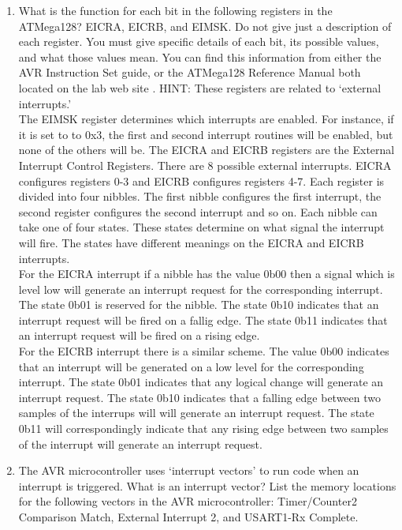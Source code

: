 \documentclass[12pt,letterpaper]{article}
\begin{document}
\begin{enumerate}
    \item What is the function for each bit in the following registers in the
    ATMega128? EICRA, EICRB, and EIMSK. Do not give just a description of each
    register. You must give specific details of each bit, its possible values,
    and what those values mean.  You can find this information from either the
    AVR Instruction Set guide, or the ATMega128 Reference Manual both located
    on the lab web site .  HINT:  These  registers  are  related  to  ‘external
    interrupts.’\\
    The EIMSK register determines which interrupts are enabled. For instance,
if it is set to to 0x3, the first and second interrupt routines will be
enabled, but none of the others will be.
    The EICRA and EICRB registers are the External Interrupt Control Registers.
    There are 8 possible external interrupts. EICRA configures registers 0-3
    and EICRB configures registers 4-7. Each register is divided into four
    nibbles. The first nibble configures the first interrupt, the second
    register configures the second interrupt and so on. Each nibble can take
    one of four states. These states determine on what signal the interrupt
    will fire. The states have different meanings on the EICRA and EICRB
    interrupts.\\
    For the EICRA interrupt if a nibble has the value 0b00 then a signal which is
    level low will generate an interrupt request for the corresponding
    interrupt. The state 0b01 is reserved for the nibble. The state 0b10
    indicates that an interrupt request will be fired on a fallig edge. The
    state 0b11 indicates that an interrupt request will be fired on a rising
    edge.\\
    For the EICRB interrupt there is a similar scheme. The value 0b00 indicates
    that an interrupt will be generated on a low level for the corresponding
    interrupt. The state 0b01 indicates that any logical change will generate
    an interrupt request. The state 0b10 indicates that a falling edge between
    two samples of the interrups will will generate an interrupt request. The
    state 0b11 will correspondingly indicate that any rising edge between two
    samples of the interrupt will generate an interrupt request.\\

    \item The  AVR  microcontroller  uses  ‘interrupt  vectors’  to  run  code  when  an  interrupt  is  triggered.  What  is  an  interrupt  vector?  List the memory locations for the following vectors in the AVR microcontroller: Timer/Counter2 Comparison Match, External Interrupt 2, and USART1-Rx Complete.\\


\end{enumerate}
\end{document}
